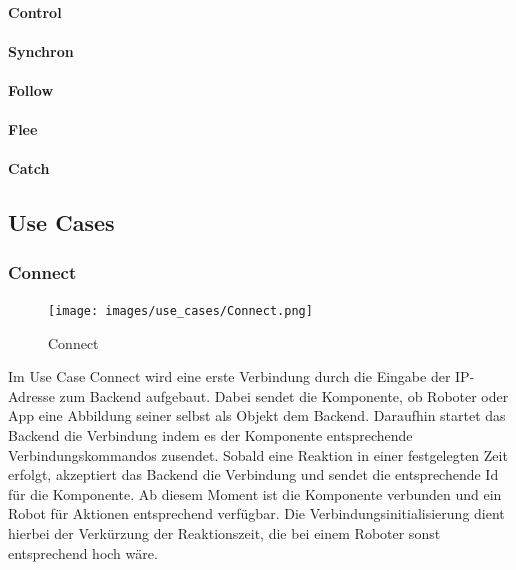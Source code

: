 

\paragraph{Control}



\paragraph{Synchron}
\paragraph{Follow}
\paragraph{Flee}
\paragraph{Catch}

\subsection{Use Cases}
\subsubsection{Connect}

\begin{figure}[h]
	\begin{center}
		\texttt{[image: images/use\_cases/Connect.png]}
	\end{center}
	\caption{Connect}
	\label{fig:UC_Connect}
\end{figure}

\noindent
Im Use Case Connect wird eine erste Verbindung durch die Eingabe der IP-Adresse zum Backend aufgebaut. Dabei sendet die Komponente, ob Roboter oder App eine Abbildung seiner selbst als Objekt dem Backend. Daraufhin startet das Backend die Verbindung indem es der Komponente entsprechende Verbindungskommandos zusendet. Sobald eine Reaktion in einer festgelegten Zeit erfolgt, akzeptiert das Backend die Verbindung und sendet die entsprechende Id für die Komponente. Ab diesem Moment ist die Komponente verbunden und ein Robot für Aktionen entsprechend verfügbar. Die Verbindungsinitialisierung dient hierbei der Verkürzung der Reaktionszeit, die bei einem Roboter sonst entsprechend hoch wäre.


